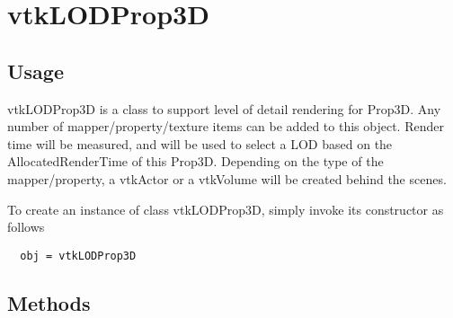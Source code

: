 \section{vtkLODProp3D}

\subsection{Usage}

 vtkLODProp3D is a class to support level of detail rendering for Prop3D.
 Any number of mapper/property/texture items can be added to this object.
 Render time will be measured, and will be used to select a LOD based on
 the AllocatedRenderTime of this Prop3D. Depending on the type of the
 mapper/property, a vtkActor or a vtkVolume will be created behind the
 scenes. 

To create an instance of class vtkLODProp3D, simply
invoke its constructor as follows
\begin{verbatim}
  obj = vtkLODProp3D
\end{verbatim}
\subsection{Methods}


